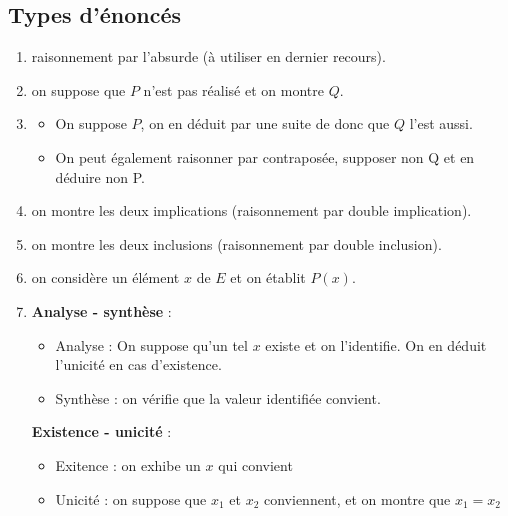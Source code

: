 \subsection{Types d'énoncés}

\begin{enumerate}
	\item{}
    raisonnement par l'absurde (à utiliser en dernier recours).

    \item{}
    on suppose que $P$ n'est pas réalisé et on montre $Q$.

    \item{}
    \begin{itemize}
        \item On suppose $P$, on en déduit par une suite de donc que $Q$ l'est aussi.
        \item On peut également raisonner par contraposée, supposer non Q et en déduire non P.
    \end{itemize}

    \item{}
    on montre les deux implications (raisonnement par double implication).

    \item{}
    on montre les deux inclusions (raisonnement par double inclusion).

    \item{}
    on considère un élément $x$ de $E$ et on établit $P(x)$.

    \item{}

    \textbf{Analyse - synthèse} :
    \begin{itemize}
        \item Analyse : On suppose qu'un tel $x$ existe et on l'identifie. On en 
        déduit l'unicité en cas d'existence. 
        \item Synthèse : on vérifie que la valeur identifiée convient. 
    \end{itemize}

    \textbf{Existence - unicité} :
    \begin{itemize}
        \item Exitence : on exhibe un $x$ qui convient
        \item Unicité : on suppose que $x_1$ et $x_2$ conviennent, et on montre que 
        $x_1 = x_2$
    \end{itemize}


\end{enumerate}
